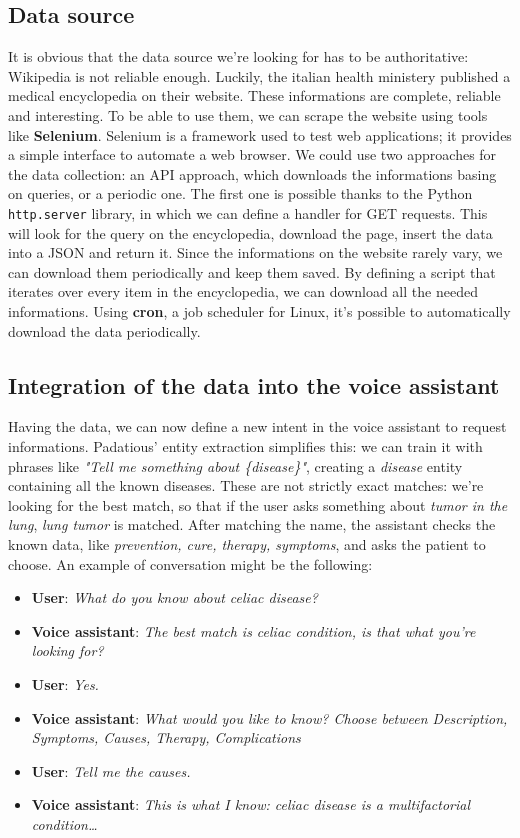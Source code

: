 \documentclass[conference]{IEEEtran}
\begin{document}
\subsection{Data source}
It is obvious that the data source we're looking for has to be authoritative: Wikipedia is not reliable enough. Luckily, the italian health ministery published a medical encyclopedia on their website. These informations are complete, reliable and interesting. To be able to use them, we can scrape the website using tools like \textbf{Selenium}. Selenium is a framework used to test web applications; it provides a simple interface to automate a web browser\cite{selenium}. We could use two approaches for the data collection: an API approach, which downloads the informations basing on queries, or a periodic one. The first one is possible thanks to the Python \texttt{http.server} library, in which we can define a handler for GET requests. This will look for the query on the encyclopedia, download the page, insert the data into a JSON and return it. Since the informations on the website rarely vary, we can download them periodically and keep them saved. By defining a script that iterates over every item in the encyclopedia, we can download all the needed informations. Using \textbf{cron}, a job scheduler for Linux, it's possible to automatically download the data periodically.
\subsection{Integration of the data into the voice assistant}
Having the data, we can now define a new intent in the voice assistant to request informations. Padatious' entity extraction simplifies this: we can train it with phrases like \textit{"Tell me something about \{disease\}"}, creating a \textit{disease} entity containing all the known diseases. These are not strictly exact matches: we're looking for the best match, so that if the user asks something about \textit{tumor in the lung}, \textit{lung tumor} is matched. After matching the name, the assistant checks the known data, like \textit{prevention, cure, therapy, symptoms}, and asks the patient to choose.
An example of conversation might be the following:
\begin{itemize}
    \item \textbf{User}: \textit{What do you know about celiac disease?}
    \item \textbf{Voice assistant}: \textit{The best match is celiac condition, is that what you're looking for?}
    \item \textbf{User}: \textit{Yes.}
    \item \textbf{Voice assistant}: \textit{What would you like to know? Choose between Description, Symptoms, Causes, Therapy, Complications}
    \item \textbf{User}: \textit{Tell me the causes.}
    \item \textbf{Voice assistant}: \textit{This is what I know: celiac disease is a multifactorial condition\dots}
\end{itemize}
\end{document}
